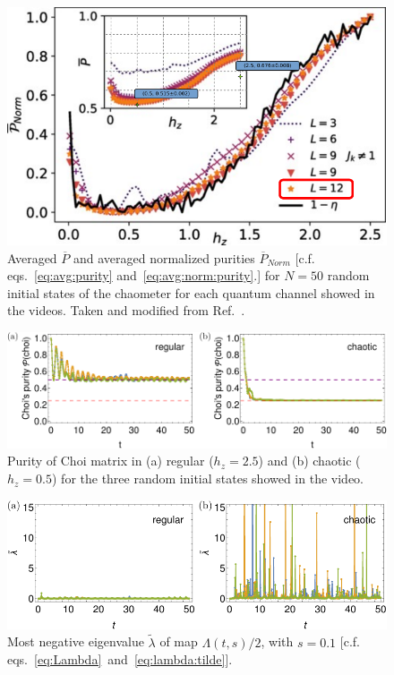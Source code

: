 \documentclass[10pt,letterpaper]{article}
\begin{document}
\begin{figure}
\centering
\includegraphics[width=0.9\linewidth]{mirkin2021_fig2_modified.pdf}
\caption{Averaged $\overline P$ and averaged normalized purities 
$\overline P_{Norm}$ [c.f. eqs.~\eqref{eq:avg:purity} and~\eqref{eq:avg:norm:purity}.] for $N=50$ random initial states of 
the chaometer for each quantum channel showed in the videos.
Taken and modified from Ref.~\cite{mirkin2021quantum}.}
\label{fig:mirkin2021:fig2:modified}
\end{figure}

\begin{figure}
\centering
\includegraphics[width=\textwidth]{choi_purity.pdf}
\caption{Purity of Choi matrix in (a) regular ($h_z=2.5$) and (b) chaotic ($h_z=0.5$) for the three random initial states showed in the video.}
\label{fig:choi:purity}
\end{figure}

\begin{figure}
\centering
\includegraphics[width=\textwidth]{lambda_tilde_choi.pdf}
\caption{Most negative eigenvalue $\tilde \lambda$ of map $\Lambda(t,s)/2$, 
with $s=0.1$ [c.f. eqs.~\eqref{eq:Lambda}~and~\eqref{eq:lambda:tilde}].}
\label{fig:lambda:tilde:choi}
\end{figure}
\end{document}
